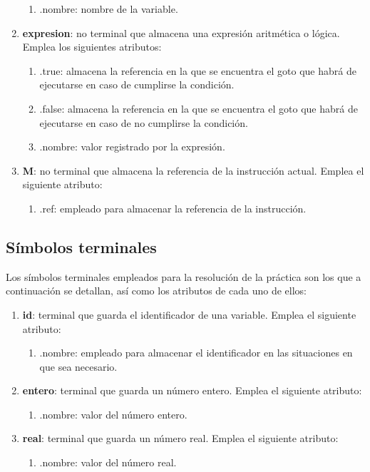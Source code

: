 \documentclass[12pt,a4paper,landscape]{article}
\theoremstyle{mytheor}
\begin{document}
\begin{enumerate}
  \begin{enumerate}
    \item .nombre: nombre de la variable.
  \end{enumerate}
  \item \textbf{expresion}: no terminal que almacena una expresión aritmética o lógica. Emplea los siguientes atributos:
  \begin{enumerate}
    \item .true: almacena la referencia en la que se encuentra el goto que habrá de ejecutarse en caso de cumplirse la condición.
    \item .false: almacena la referencia en la que se encuentra el goto que habrá de ejecutarse en caso de no cumplirse la condición.
    \item .nombre: valor registrado por la expresión.
  \end{enumerate}
  \item \textbf{M}: no terminal que almacena la referencia de la instrucción actual. Emplea el siguiente atributo:
  \begin{enumerate}
    \item .ref: empleado para almacenar la referencia de la instrucción.
  \end{enumerate}
\end{enumerate}

\subsection{Símbolos terminales}

Los símbolos terminales empleados para la resolución de la práctica son los que a continuación se detallan, así como los atributos de cada uno de ellos:
\begin{enumerate}
  \item \textbf{id}: terminal que guarda el identificador de una variable. Emplea el siguiente atributo:
  \begin{enumerate}
    \item .nombre: empleado para almacenar el identificador en las situaciones en que sea necesario.
  \end{enumerate}
  \item \textbf{entero}: terminal que guarda un número entero. Emplea el siguiente atributo:
  \begin{enumerate}
    \item .nombre: valor del número entero.
  \end{enumerate}
  \item \textbf{real}: terminal que guarda un número real. Emplea el siguiente atributo:
  \begin{enumerate}
    \item .nombre: valor del número real.
  \end{enumerate}
\end{enumerate}
\end{document}
